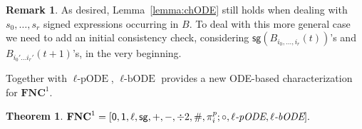 \documentclass[11pt, oneside]{article}
\newcommand{\fun}[1]{\mathsf{#1}}
\newcommand{\NC}{\mathbf{FNC}}
\newtheorem{theorem}{Theorem}
\theoremstyle{definition}
\newtheorem{remark}{Remark}
\newcommand{\chODE}{\ell\text{-bODE}}
\newcommand{\pODE}{\ell\text{-pODE}}
\begin{document}

\begin{remark}
    As desired, Lemma~\ref{lemma:chODE} still holds when dealing with $s_0, \dots, s_r$ signed expressions occurring in $B$.
    To deal with this more general case we need to add an initial consistency check, considering $\fun{sg}(B_{i_0,\dots, i_r}(t))$'s and $B_{i_0'\dots i_r'}(t+1)$'s, in the very beginning.
\end{remark}




Together with $\pODE$, $\chODE$ provides a new ODE-based characterization for $\NC^1$.


\begin{theorem}
    $\NC^1 = [\fun{0}, \fun{1}, \ell, \fun{sg}, +, -, \div 2, \#, \pi^p_i; \circ, \ell\emph{-pODE}, \ell\emph{-bODE}].$
\end{theorem}
\end{document}
